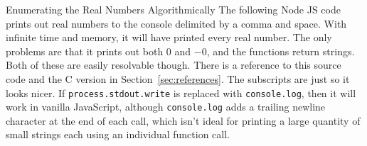 \documentclass[12pt]{article}
\begin{document}
\pagebreak\begin{section}{Enumerating the Real Numbers Algorithmically}\label{sec:algorithm code}
	The following Node JS code prints out real numbers to the console delimited by a comma and space.
	With infinite time and memory, it will have printed every real number. The only problems are that
	it prints out both $0$ and $-0$, and the functions return strings. Both of these are easily resolvable
	though. There is a reference to this source code and the C version in Section~\ref{sec:references}.
	The subscripts are just so it looks nicer. If \texttt{process.stdout.write} is replaced with
	\texttt{console.log}, then it will work in vanilla JavaScript, although \texttt{console.log} adds
	a trailing newline character at the end of each call, which isn't ideal for printing a large quantity
	of small strings each using an individual function call.


\end{section}
\end{document}
